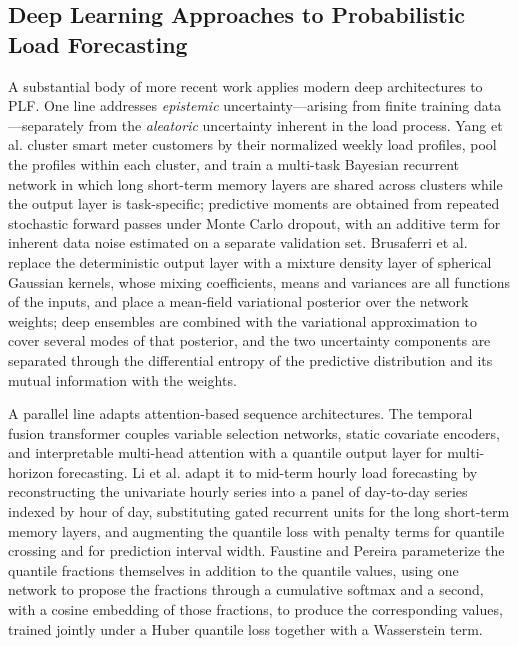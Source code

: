 \documentclass[10pt,journal,compsoc]{IEEEtran}
\begin{document}
\subsection{Deep Learning Approaches to Probabilistic Load Forecasting}
A substantial body of more recent work applies modern deep architectures to PLF. One line
addresses \emph{epistemic} uncertainty---arising from finite training data---separately from
the \emph{aleatoric} uncertainty inherent in the load process. Yang et al.
\cite{yang2020bayesian} cluster smart meter customers by their normalized weekly load
profiles, pool the profiles within each cluster, and train a multi-task Bayesian recurrent
network in which long short-term memory layers are shared across clusters while the output
layer is task-specific; predictive moments are obtained from repeated stochastic forward
passes under Monte Carlo dropout, with an additive term for inherent data noise estimated on a
separate validation set. Brusaferri et al. \cite{brusaferri2022probabilistic} replace the
deterministic output layer with a mixture density layer of spherical Gaussian kernels, whose
mixing coefficients, means and variances are all functions of the inputs, and place a
mean-field variational posterior over the network weights; deep ensembles are combined with
the variational approximation to cover several modes of that posterior, and the two
uncertainty components are separated through the differential entropy of the predictive
distribution and its mutual information with the weights.

A parallel line adapts attention-based sequence architectures. The temporal fusion
transformer \cite{lim2021temporal} couples variable selection networks, static covariate
encoders, and interpretable multi-head attention with a quantile output layer for
multi-horizon forecasting. Li et al. \cite{li2023probabilistic} adapt it to mid-term hourly
load forecasting by reconstructing the univariate hourly series into a panel of day-to-day
series indexed by hour of day, substituting gated recurrent units for the long short-term
memory layers, and augmenting the quantile loss with penalty terms for quantile crossing and
for prediction interval width. Faustine and Pereira \cite{faustine2022fpseq2q} parameterize
the quantile fractions themselves in addition to the quantile values, using one network to
propose the fractions through a cumulative softmax and a second, with a cosine embedding of
those fractions, to produce the corresponding values, trained jointly under a Huber quantile
loss together with a Wasserstein term.
\end{document}
